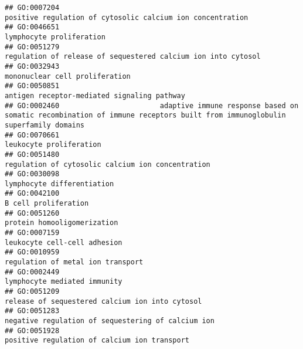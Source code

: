 \documentclass[
]{article}
\begin{document}
\begin{verbatim}
## GO:0007204                                                                                       positive regulation of cytosolic calcium ion concentration
## GO:0046651                                                                                                                         lymphocyte proliferation
## GO:0051279                                                                                    regulation of release of sequestered calcium ion into cytosol
## GO:0032943                                                                                                                   mononuclear cell proliferation
## GO:0050851                                                                                                      antigen receptor-mediated signaling pathway
## GO:0002460                        adaptive immune response based on somatic recombination of immune receptors built from immunoglobulin superfamily domains
## GO:0070661                                                                                                                          leukocyte proliferation
## GO:0051480                                                                                                regulation of cytosolic calcium ion concentration
## GO:0030098                                                                                                                       lymphocyte differentiation
## GO:0042100                                                                                                                             B cell proliferation
## GO:0051260                                                                                                                      protein homooligomerization
## GO:0007159                                                                                                                     leukocyte cell-cell adhesion
## GO:0010959                                                                                                                regulation of metal ion transport
## GO:0002449                                                                                                                     lymphocyte mediated immunity
## GO:0051209                                                                                                  release of sequestered calcium ion into cytosol
## GO:0051283                                                                                               negative regulation of sequestering of calcium ion
## GO:0051928                                                                                                     positive regulation of calcium ion transport

\end{verbatim}
\end{document}
